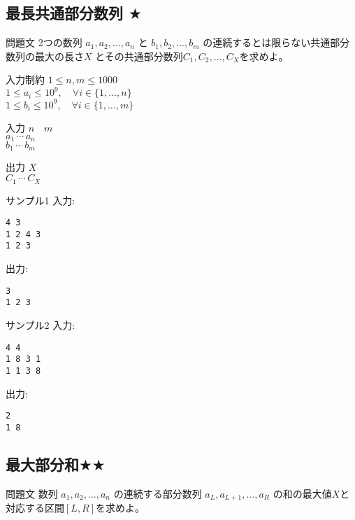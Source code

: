\documentclass[a4paper,twoside,onecolumn,openany,article,10pt]{memoir}
\theoremstyle{remark}
\begin{document}
\clearpage
\subsection{最長共通部分数列 $\bigstar$}
\begin{itembox}[l]{問題文}
2つの数列 $a_1, a_2,\dotsc, a_n$ 
と $b_1, b_2,\dotsc, b_m$ の連続するとは限らない共通部分数列の最大の長さ$X$
とその共通部分数列$C_1, C_2,\dotsc, C_X$を求めよ。
\end{itembox}

\begin{itembox}[l]{入力制約}
$1\le n, m\le 1000$\\
$1\le a_i\le 10^9,\quad\forall i\in\{1,\dotsc,n\}$\\
$1\le b_i\le 10^9,\quad\forall i\in\{1,\dotsc,m\}$
\end{itembox}

\begin{itembox}[l]{入力}
$n\quad m$\\
$a_1\, \cdots\, a_n$\\
$b_1\, \cdots\, b_m$
\end{itembox}

\begin{itembox}[l]{出力}
$X$\\
$C_1\, \cdots\, C_X$
\end{itembox}

\begin{itembox}[l]{サンプル1}
入力:
\begin{verbatim}
4 3
1 2 4 3
1 2 3
\end{verbatim}
出力:
\begin{verbatim}
3
1 2 3
\end{verbatim}
\end{itembox}

\begin{itembox}[l]{サンプル2}
入力:
\begin{verbatim}
4 4
1 8 3 1
1 1 3 8
\end{verbatim}
出力:
\begin{verbatim}
2
1 8
\end{verbatim}
\end{itembox}

\clearpage
\subsection{最大部分和$\bigstar\bigstar$}
\begin{itembox}[l]{問題文}
数列 $a_1, a_2,\dotsc, a_n$ の連続する部分数列 $a_{L}, a_{L+1},\dotsc, a_R$ の和の最大値$X$と対応する区間$[L,R]$を求めよ。
\end{itembox}
\end{document}
